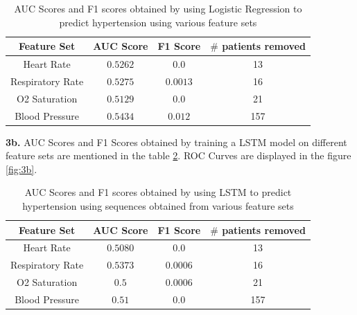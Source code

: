 \documentclass[]{article}
\begin{document}
\begin{table}[h!]
	\centering
	\begin{tabular}{|c|c|c|c|}
		\hline
		\textbf{Feature Set} & \textbf{AUC Score} & \textbf{F1 Score} & \textbf{$\#$ patients removed}\\
		\hline
		Heart Rate & $0.5262$ & $0.0$ & 13\\
		Respiratory Rate & $0.5275$ & $0.0013$ & 16\\
		O2 Saturation & $0.5129$ & $0.0$ & 21\\
		Blood Pressure & $0.5434$ & $0.012$ & 157\\
		\hline
	\end{tabular}
	\caption{AUC Scores and F1 scores obtained by using Logistic Regression to predict hypertension using various feature sets}
	\label{tab:3a}
\end{table}

\textbf{3b.} AUC Scores and F1 Scores obtained by training a LSTM model on different feature sets are mentioned in the table \ref{tab:3b}. ROC Curves are displayed in the figure \ref{fig:3b}.

\begin{table}[h!]
	\centering
	\begin{tabular}{|c|c|c|c|}
		\hline
		\textbf{Feature Set} & \textbf{AUC Score} & \textbf{F1 Score} & \textbf{$\#$ patients removed}\\
		\hline
		Heart Rate & $0.5080$ & $0.0$ & 13\\
		Respiratory Rate & $0.5373$ & $0.0006$ & 16\\
		O2 Saturation & $0.5$ & $0.0006$ & 21\\
		Blood Pressure & $0.51$ & $0.0$ & 157\\
		\hline
	\end{tabular}
	\caption{AUC Scores and F1 scores obtained by using LSTM to predict hypertension using sequences obtained from various feature sets}
	\label{tab:3b}
\end{table}
\end{document}
